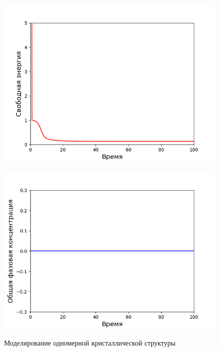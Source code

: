 \begin{figure}[p]
    \begin{minipage}{0.49\linewidth}
        \includegraphics[width=\linewidth]{images/3-energy.png}
        \label{fig:modeling_1_d:5}
    \end{minipage}
    \hfill
    \begin{minipage}{0.49\linewidth}
        \includegraphics[width=\linewidth]{images/3-phase_balance.png}
        \label{fig:modeling_1_d:6}
    \end{minipage}
    
    \caption{Моделирование одномерной кристаллической структуры}
    \label{fig:modeling_1_d}
\end{figure}


